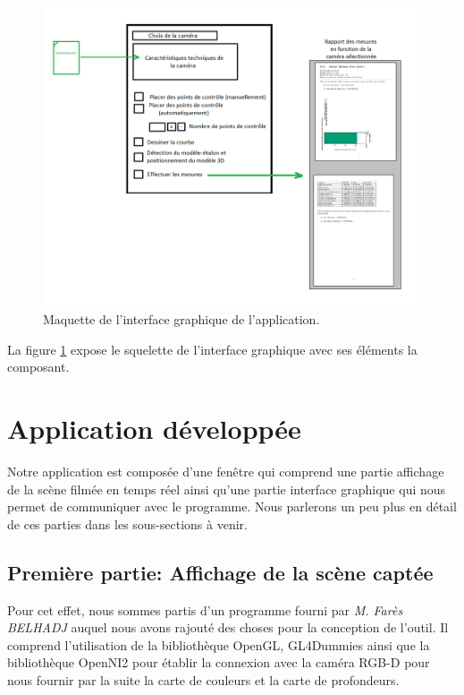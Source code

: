 \documentclass[a4paper, 12pt]{book}
\newcounter{program}[subsection]
\begin{document}
\begin{center}
	\begin{figure}[H]
  		\hspace{-1.5cm}
 		\includegraphics[scale=0.5]{images/maquetteApp2.png} \hspace{2cm}
  		\caption{Maquette de l'interface graphique de l'application.\label{fig-interface}}
	\end{figure}
\end{center}

La figure \ref{fig-interface} expose le squelette de l'interface graphique avec ses éléments la composant.

\section{Application développée}
Notre application est composée d'une fenêtre qui comprend une partie affichage de la scène filmée en temps réel ainsi qu'une partie interface graphique qui nous permet de communiquer avec le programme. Nous parlerons un peu plus en détail de ces parties dans les sous-sections à venir.
\subsection{Première partie: Affichage de la scène captée }
Pour cet effet, nous sommes partis d'un programme fourni par \emph{M. Farès BELHADJ} auquel nous avons rajouté des choses pour la conception de l'outil. Il comprend l'utilisation de la bibliothèque OpenGL, GL4Dummies ainsi que la bibliothèque OpenNI2 pour établir la connexion avec la caméra RGB-D pour nous fournir par la suite la carte de couleurs et la carte de profondeurs.
\end{document}
